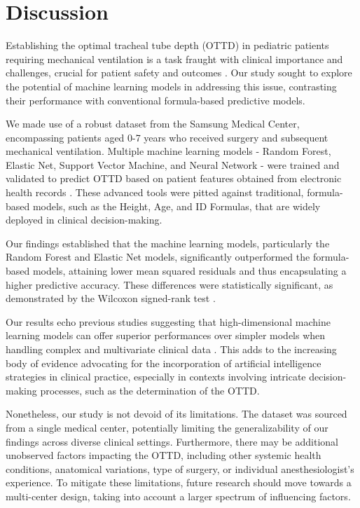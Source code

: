 \documentclass[11pt]{article}
\begin{document}
\section*{Discussion}

Establishing the optimal tracheal tube depth (OTTD) in pediatric patients requiring mechanical ventilation is a task fraught with clinical importance and challenges, crucial for patient safety and outcomes \cite{Klompas2011MulticenterEO, Ladha2015IntraoperativePM}. Our study sought to explore the potential of machine learning models in addressing this issue, contrasting their performance with conventional formula-based predictive models.

We made use of a robust dataset from the Samsung Medical Center, encompassing patients aged 0-7 years who received surgery and subsequent mechanical ventilation. Multiple machine learning models - Random Forest, Elastic Net, Support Vector Machine, and Neural Network - were trained and validated to predict OTTD based on patient features obtained from electronic health records \cite{Lee2009BedsidePO, Ingelse2017EarlyFO}. These advanced tools were pitted against traditional, formula-based models, such as the Height, Age, and ID Formulas, that are widely deployed in clinical decision-making.

Our findings established that the machine learning models, particularly the Random Forest and Elastic Net models, significantly outperformed the formula-based models, attaining lower mean squared residuals and thus encapsulating a higher predictive accuracy. These differences were statistically significant, as demonstrated by the Wilcoxon signed-rank test \cite{Rechenauer2018ACO, Jalalonmuhali2018EstimatingRF}.

Our results echo previous studies suggesting that high-dimensional machine learning models can offer superior performances over simpler models when handling complex and multivariate clinical data \cite{Desgrouas2021KineticGF, Gerhardt2011CreatininebasedGF}. This adds to the increasing body of evidence advocating for the incorporation of artificial intelligence strategies in clinical practice, especially in contexts involving intricate decision-making processes, such as the determination of the OTTD.

Nonetheless, our study is not devoid of its limitations. The dataset was sourced from a single medical center, potentially limiting the generalizability of our findings across diverse clinical settings. Furthermore, there may be additional unobserved factors impacting the OTTD, including other systemic health conditions, anatomical variations, type of surgery, or individual anesthesiologist's experience. To mitigate these limitations, future research should move towards a multi-center design, taking into account a larger spectrum of influencing factors. 
\end{document}
